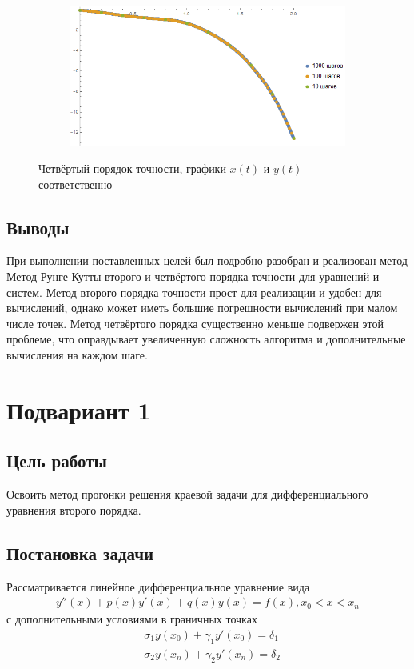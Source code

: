 \documentclass[a4paper,12pt,titlepage,finall]{article}
\begin{document}
\begin{enumerate}
\begin{figure}[h]
\begin{subfigure}{.5\textwidth}
\end{subfigure}%
\begin{subfigure}{.5\textwidth}
  \centering
  \includegraphics[width=\textwidth]{test_1_7_4_y.png}
\end{subfigure}
\caption{Четвёртый порядок точности, графики $x(t)$ и $y(t)$ соответственно}
\end{figure}
\end{enumerate}
\subsection{Выводы}
При выполнении поставленных целей был подробно разобран и реализован метод Метод Рунге-Кутты второго и четвёртого порядка точности для уравнений и систем. Метод второго порядка точности прост для реализации и удобен для вычислений, однако может иметь большие погрешности вычислений при малом числе точек. Метод четвёртого порядка существенно меньше подвержен этой проблеме, что оправдывает увеличенную сложность алгоритма и дополнительные вычисления на каждом шаге.

\newpage
\section{Подвариант 1}
\subsection{Цель работы}
Освоить метод прогонки решения краевой задачи для дифференциального
уравнения второго порядка.

\subsection{Постановка задачи}
Рассматривается линейное дифференциальное уравнение вида
\begin{align*}
y''(x) + p(x) y'(x) + q(x) y(x) = f(x), x_0 < x < x_n  
\end{align*}
с дополнительными условиями в граничных точках
\begin{align*}
&\sigma_1 y(x_0) + \gamma_1 y'(x_0) = \delta_1\\
&\sigma_2 y(x_n) + \gamma_2 y'(x_n) = \delta_2
\end{align*}
\end{document}

